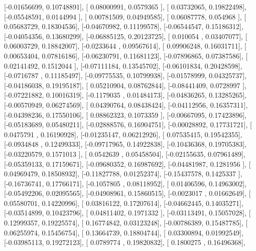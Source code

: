 \documentclass{article}
\begin{document}
       [-0.01656699,  0.10748891],
       [ 0.08000991,  0.0579365 ],
       [ 0.03732065,  0.19822498],
       [-0.05548591,  0.0144994 ],
       [ 0.00781509,  0.04949585],
       [ 0.06087778,  0.054968  ],
       [ 0.05683729,  0.18304536],
       [-0.04670982,  0.11199578],
       [-0.06544547,  0.15186312],
       [-0.04054356,  0.13680299],
       [-0.06885125,  0.20123725],
       [ 0.010054  ,  0.03407077],
       [ 0.06003729,  0.18842007],
       [-0.0233644 ,  0.09567614],
       [ 0.09906248,  0.16031711],
       [ 0.00653404,  0.07816186],
       [-0.06230791,  0.11681123],
       [-0.07896865,  0.07387586],
       [ 0.02141492,  0.1512044 ],
       [-0.07111184,  0.13545702],
       [-0.06101834,  0.20428598],
       [-0.0716787 ,  0.11185497],
       [-0.09775535,  0.10799938],
       [-0.01578999,  0.04325737],
       [-0.04186038,  0.19195187],
       [ 0.05210904,  0.08762844],
       [-0.08441409,  0.0728997 ],
       [-0.07221882,  0.10016319],
       [-0.1179035 ,  0.01484173],
       [-0.04836265,  0.13285265],
       [-0.00570949,  0.06274569],
       [ 0.04390764,  0.08438424],
       [-0.04112956,  0.16357311],
       [-0.04398236,  0.17550106],
       [ 0.08862323,  0.1073359 ],
       [-0.00667095,  0.17423896],
       [-0.05183689,  0.05480211],
       [-0.02888576,  0.16904751],
       [-0.00028892,  0.17731721],
       [ 0.0475791 ,  0.16190928],
       [-0.01235147,  0.06212926],
       [ 0.07535415,  0.19542355],
       [-0.0934848 ,  0.12499333],
       [-0.09717965,  0.14922838],
       [-0.10436368,  0.19705383],
       [-0.03220579,  0.1571013 ],
       [ 0.0542639 ,  0.05458504],
       [-0.02155635,  0.07961489],
       [-0.05359133,  0.17159671],
       [-0.09680352,  0.16987692],
       [-0.04481987,  0.1281956 ],
       [ 0.04969479,  0.18508932],
       [-0.11827788,  0.01252374],
       [-0.15437578,  0.1425337 ],
       [-0.16736741,  0.17766171],
       [-0.1057805 ,  0.08118952],
       [ 0.01406596,  0.14963002],
       [-0.05492206,  0.02095565],
       [-0.04908961,  0.15860515],
       [-0.0023017 ,  0.01662649],
       [ 0.05580701,  0.14220996],
       [ 0.03816122,  0.17207614],
       [-0.04662445,  0.14035271],
       [-0.03514899,  0.10423796],
       [ 0.04811402,  0.1971332 ],
       [-0.03113491,  0.15057028],
       [ 0.12999357,  0.19225574],
       [ 0.16774842,  0.03123248],
       [-0.00786389,  0.15487785],
       [ 0.06255974,  0.15456754],
       [ 0.13664739,  0.18804744],
       [ 0.03300894,  0.01992549],
       [-0.03985113,  0.19272123],
       [ 0.0789774 ,  0.19820832],
       [ 0.1800275 ,  0.16496368],
\end{document}
